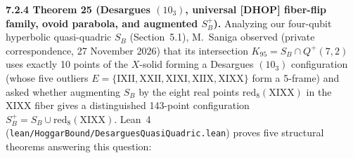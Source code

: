 \documentclass[11pt,a4paper]{article}
\begin{document}
\textbf{7.2.4 Theorem 25 (Desargues \((10_3)\), universal {[}DHOP{]} fiber-flip family, ovoid parabola, and augmented \(S_B^+\)).}
Analyzing our four-qubit hyperbolic quasi-quadric \(S_B\) (Section~5.1), M.~Saniga observed (private correspondence, 27 November 2026) that its intersection \(K_{95} = S_B \cap Q^+(7,2)\) uses exactly 10 points of the \(X\)-solid forming a Desargues \((10_3)\) configuration (whose five outliers \(E = \{\mathrm{IXII}, \mathrm{XXII}, \mathrm{XIXI}, \mathrm{XIIX}, \mathrm{XIXX}\}\) form a 5-frame) and asked whether augmenting \(S_B\) by the eight real points \(\mathrm{red}_8(\mathrm{XIXX})\) in the \(\mathrm{XIXX}\) fiber gives a distinguished 143-point configuration \(S_B^+ = S_B \cup \mathrm{red}_8(\mathrm{XIXX})\). Lean~4 (\nolinkurl{lean/HoggarBound/DesarguesQuasiQuadric.lean}) proves five structural theorems answering this question:
\end{document}

